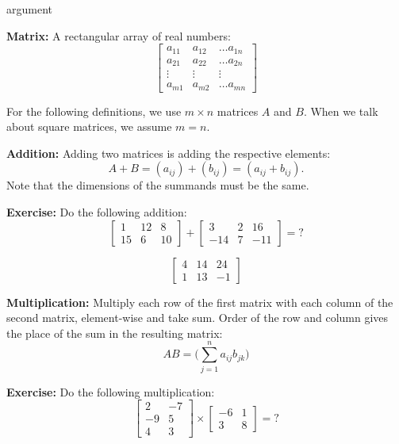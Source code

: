 \begin{labeling}{argument}
    \item[\textbf{Matrix:}] A rectangular array of real numbers:
    \[
        \begin{bmatrix}
            a_{11} & a_{12} & \ldots a_{1n} \\
            a_{21} & a_{22} & \ldots a_{2n} \\
            \vdots & \vdots & \vdots        \\
            a_{m1} & a_{m2} & \ldots a_{mn}
        \end{bmatrix}
    \]

    For the following definitions, we use $m \times n$ matrices $A$ and $B$. When we talk about square matrices, we assume $m = n$.

    \item[\textbf{Addition:}] Adding two matrices is adding the respective elements:
    \[ A + B = (a_{ij}) + (b_{ij}) = (a_{ij} + b_{ij}). \]
    Note that the dimensions of the summands must be the same.

    \textbf{Exercise:} Do the following addition:
    \[
        \begin{bmatrix}
            1  & 12 & 8  \\
            15 & 6  & 10
        \end{bmatrix}
        +
        \begin{bmatrix}
            3   & 2 & 16  \\
            -14 & 7 & -11
        \end{bmatrix}
        =
        ?
    \]

    \begin{sol}
        \[
            \begin{bmatrix}
                4 & 14 & 24 \\
                1 & 13 & -1
            \end{bmatrix}
        \]
    \end{sol}


    \item[\textbf{Multiplication:}] Multiply each row of the first matrix with each column of the second matrix, element-wise and take sum. Order of the row and column gives the place of the sum in the resulting matrix:
    \[
        AB = \bigg( \sum_{j=1}^n a_{ij} b_{jk} \bigg)
    \]

    \textbf{Exercise:} Do the following multiplication:
    \[
        \begin{bmatrix}
            2  & -7 \\
            -9 & 5  \\
            4  & 3
        \end{bmatrix}
        \times
        \begin{bmatrix}
            -6 & 1 \\
            3  & 8
        \end{bmatrix}
        =
        ?
    \]


\end{labeling}
